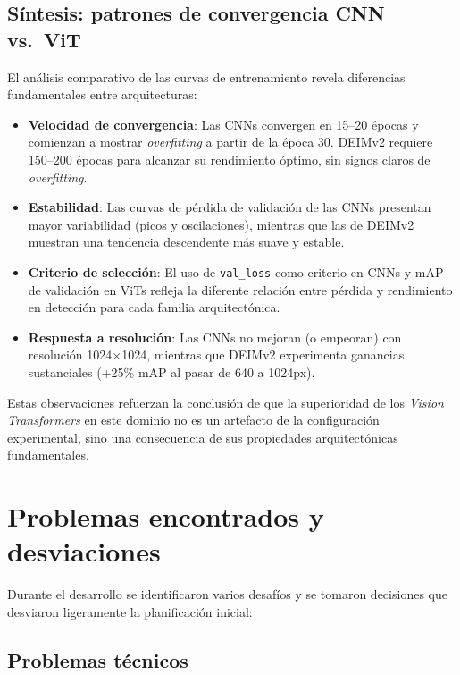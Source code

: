 \subsection{Síntesis: patrones de convergencia CNN vs.\ ViT}

El análisis comparativo de las curvas de entrenamiento revela diferencias fundamentales entre arquitecturas:

\begin{itemize}
    \item \textbf{Velocidad de convergencia}: Las CNNs convergen en 15--20 épocas y comienzan a mostrar \textit{overfitting} a partir de la época 30. DEIMv2 requiere 150--200 épocas para alcanzar su rendimiento óptimo, sin signos claros de \textit{overfitting}.
    
    \item \textbf{Estabilidad}: Las curvas de pérdida de validación de las CNNs presentan mayor variabilidad (picos y oscilaciones), mientras que las de DEIMv2 muestran una tendencia descendente más suave y estable.
    
    \item \textbf{Criterio de selección}: El uso de \texttt{val\_loss} como criterio en CNNs y mAP de validación en ViTs refleja la diferente relación entre pérdida y rendimiento en detección para cada familia arquitectónica.
    
    \item \textbf{Respuesta a resolución}: Las CNNs no mejoran (o empeoran) con resolución 1024$\times$1024, mientras que DEIMv2 experimenta ganancias sustanciales (+25\% mAP al pasar de 640 a 1024px).
\end{itemize}

Estas observaciones refuerzan la conclusión de que la superioridad de los \textit{Vision Transformers} en este dominio no es un artefacto de la configuración experimental, sino una consecuencia de sus propiedades arquitectónicas fundamentales.


\section{Problemas encontrados y desviaciones}
\label{sec:problemas}

Durante el desarrollo se identificaron varios desafíos y se tomaron decisiones que desviaron ligeramente la planificación inicial:

\subsection{Problemas técnicos}

